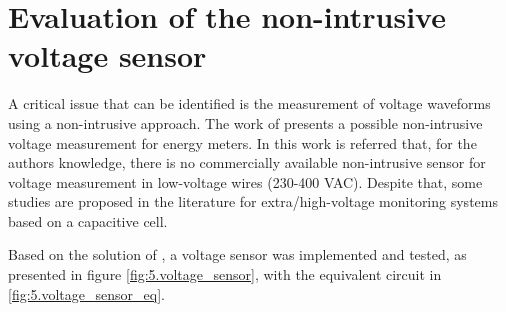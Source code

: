 \section{Evaluation of the non-intrusive voltage sensor}

	A critical issue that can be identified is the measurement of voltage waveforms using a non-intrusive approach. 
	The work of \cite{brunelli2016} presents a possible non-intrusive voltage measurement for energy meters.
	In this work is referred that, for the authors knowledge, there is no commercially available non-intrusive sensor for voltage measurement in low-voltage wires (230-400 VAC). 
	Despite that, some studies are proposed in the literature for extra/high-voltage monitoring systems based on a capacitive cell.
	
	Based on the solution of \cite{brunelli2016}, a voltage sensor was implemented and tested, as presented in figure \ref{fig:5.voltage_sensor}, with the equivalent circuit in \ref{fig:5.voltage_sensor_eq}. 
	
	
	
